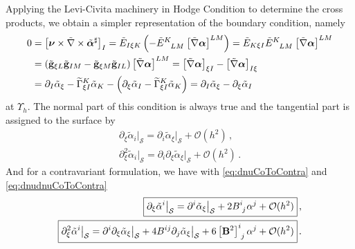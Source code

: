 \documentclass[a4paper,10pt]{scrartcl}
\newcommand{\surf}{\mathcal{S}}
\newcommand{\landau}{\mathcal{O}}
\newcommand{\nub}{\bm{\nu}}
\newcommand{\gb}{\mathbf{g}}
\newcommand{\tgb}{\tilde{\gb}}
\newcommand{\Bb}{\mathbf{B}}
\newcommand{\alphab}{\bm{\alpha}}
\newcommand{\talphab}{\tilde{\alphab}}
\newcommand{\talpha}{\tilde{\alpha}}
\newcommand{\tnabla}{\tilde{\nabla}}
\newcommand{\tch}[2]{\widetilde{\Gamma}_{#1}^{#2}}
\newcommand{\boundary}[1]{\Upsilon_{h}^{#1}}
\newcommand{\AtSurface}{\big|_{\surf}}
\newcommand{\tLC}{\tilde{E}}
\newcommand{\formComma}{\,\text{,}}
\newcommand{\formPeriod}{\,\text{.}}
\begin{document}
    Applying the Levi-Civita machinery in Hodge Condition to determine the cross products, we obtain a simpler representation of the boundary condition, namely 
    \begin{align}
      0 &= \left[ \nub \times \tnabla \times \talphab^{\sharp} \right]_{I}
         = \tLC_{I\xi K}\left( -\tensor{\tLC}{^{K}_{LM}}\left[ \tnabla\alphab \right]^{LM} \right)
         = \tLC_{K\xi I}\tensor{\tLC}{^{K}_{LM}}\left[ \tnabla\alphab \right]^{LM}\\\notag
        &= \left( \tgb_{\xi L}\tgb_{I M} - \tgb_{\xi M}\tgb_{I L}\right)\left[ \tnabla\alphab \right]^{LM}
         = \left[ \tnabla\alphab \right]_{\xi I} - \left[ \tnabla\alphab \right]_{I \xi}\\\notag
        &= \partial_{I}\talpha_{\xi} - \tch{\xi I}{K}\talpha_{K} - \left(\partial_{\xi}\talpha_{I} - \tch{\xi I}{K}\talpha_{K}\right)
         = \partial_{I}\talpha_{\xi} - \partial_{\xi}\talpha_{I}
    \end{align}
    at \( \boundary{} \).
    The normal part of this condition is always true and the tangential part is assigned to the surface by
    \begin{align}
    \boxed{
      \partial_{\xi}\talpha_{i}\AtSurface = \partial_{i}\talpha_{\xi}\AtSurface + \landau(h^{2}) \formComma}\\
    \boxed{
      \partial_{\xi}^{2}\talpha_{i}\AtSurface = \partial_{i}\partial_{\xi}\talpha_{\xi}\AtSurface + \landau(h^{2}) \formPeriod
     }
    \end{align}
    And for a contravariant formulation, we have with \eqref{eq:dnuCoToContra} and \eqref{eq:dnudnuCoToContra}
    \begin{align}
      \boxed{\partial_{\xi}\talpha^{i}\AtSurface = \partial^{i}\talpha_{\xi}\AtSurface + 2\tensor{B}{^{i}_{j}}\alpha^{j} + \landau(h^{2})} \formComma\\
      \boxed{
        \partial_{\xi}^{2}\talpha^{i}\AtSurface = \partial^{i}\partial_{\xi}\talpha_{\xi}\AtSurface
                                                  +4B^{ij}\partial_{j}\talpha_{\xi}\AtSurface
                                                  +6\tensor{\left[\Bb^{2}\right]}{^{i}_{j}}\alpha^{j} + \landau(h^{2})
      }\formPeriod
    \end{align}
\end{document}
